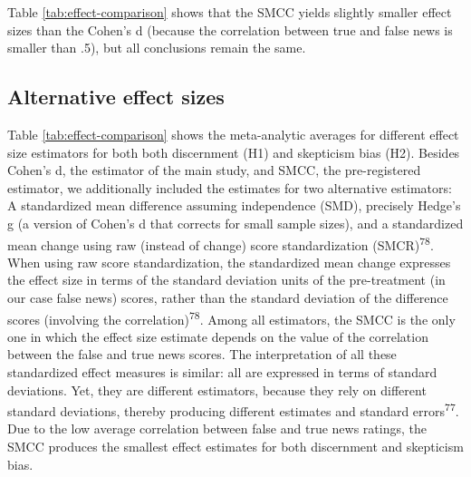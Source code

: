 \documentclass[
  man]{apa6}
\begin{document}
Table \ref{tab:effect-comparison} shows that the SMCC yields slightly smaller effect sizes than the Cohen's d (because the correlation between true and false news is smaller than .5), but all conclusions remain the same.

\subsection{Alternative effect sizes}\label{alternative-effect-sizes}

Table \ref{tab:effect-comparison} shows the meta-analytic averages for different effect size estimators for both both discernment (H1) and skepticism bias (H2). Besides Cohen's d, the estimator of the main study, and SMCC, the pre-registered estimator, we additionally included the estimates for two alternative estimators: A standardized mean difference assuming independence (SMD), precisely Hedge's g (a version of Cohen's d that corrects for small sample sizes), and a standardized mean change using raw (instead of change) score standardization (SMCR)\textsuperscript{78}. When using raw score standardization, the standardized mean change expresses the effect size in terms of the standard deviation units of the pre-treatment (in our case false news) scores, rather than the standard deviation of the difference scores (involving the correlation)\textsuperscript{78}. Among all estimators, the SMCC is the only one in which the effect size estimate depends on the value of the correlation between the false and true news scores. The interpretation of all these standardized effect measures is similar: all are expressed in terms of standard deviations. Yet, they are different estimators, because they rely on different standard deviations, thereby producing different estimates and standard errors\textsuperscript{77}. Due to the low average correlation between false and true news ratings, the SMCC produces the smallest effect estimates for both discernment and skepticism bias.
\end{document}
